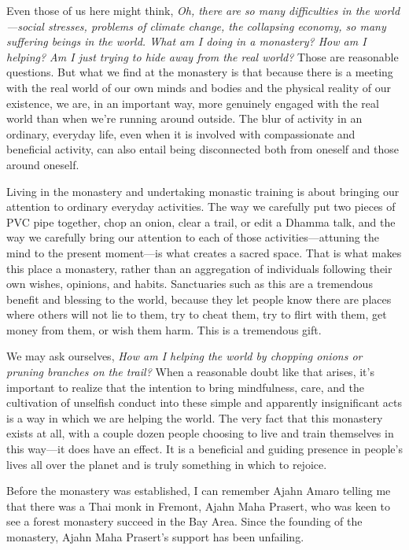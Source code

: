 Even those of us here might think, \emph{Oh, there are so many 
difficulties in the world---social stresses, problems of climate 
change, the collapsing economy, so many suffering beings in the world. 
What am I doing in a monastery? How am I helping? Am I just trying to 
hide away from the real world?} Those are reasonable questions. But 
what we find at the monastery is that because there is a meeting with 
the real world of our own minds and bodies and the physical reality of 
our existence, we are, in an important way, more genuinely engaged with 
the real world than when we're running around outside. The blur of 
activity in an ordinary, everyday life, even when it is involved with 
compassionate and beneficial activity, can also entail being 
disconnected both from oneself and those around oneself.

Living in the monastery and undertaking monastic training is about 
bringing our attention to ordinary everyday activities. The way we 
carefully put two pieces of PVC pipe together, chop an onion, clear a 
trail, or edit a Dhamma talk, and the way we carefully bring our 
attention to each of those activities---attuning the mind to the 
present moment---is what creates a sacred space. That is what makes 
this place a monastery, rather than an aggregation of individuals 
following their own wishes, opinions, and habits. Sanctuaries such as 
this are a tremendous benefit and blessing to the world, because they 
let people know there are places where others will not lie to them, try 
to cheat them, try to flirt with them, get money from them, or wish 
them harm. This is a tremendous gift.

We may ask ourselves, \emph{How am I helping the world by chopping 
onions or pruning branches on the trail?} When a reasonable doubt like 
that arises, it's important to realize that the intention to bring 
mindfulness, care, and the cultivation of unselfish conduct into these 
simple and apparently insignificant acts is a way in which we are 
helping the world. The very fact that this monastery exists at all, 
with a couple dozen people choosing to live and train themselves in 
this way---it does have an effect. It is a beneficial and guiding 
presence in people's lives all over the planet and is truly something 
in which to rejoice.


Before the monastery was established, I can remember Ajahn Amaro 
telling me that there was a Thai monk in Fremont, Ajahn Maha Prasert, 
who was keen to see a forest monastery succeed in the Bay Area. Since 
the founding of the monastery, Ajahn Maha Prasert's support has been 
unfailing.

